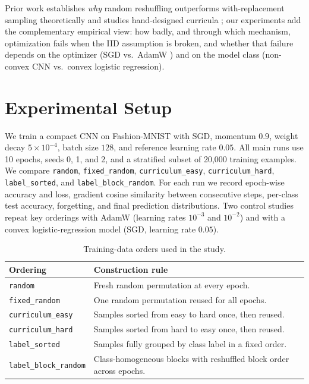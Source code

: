 \documentclass[conference]{IEEEtran}
\begin{document}
Prior work establishes \emph{why} random reshuffling outperforms
with-replacement sampling theoretically \cite{gurbuzbalaban2021} and
studies hand-designed curricula \cite{bengio2009curriculum}; our
experiments add the complementary empirical view: how badly, and through
which mechanism, optimization fails when the IID assumption is broken,
and whether that failure depends on the optimizer (SGD vs.\ AdamW
\cite{loshchilov2019adamw}) and on the model class (non-convex CNN vs.\
convex logistic regression).

\section{Experimental Setup}
We train a compact CNN on Fashion-MNIST \cite{xiao2017fashion} with SGD,
momentum $0.9$, weight decay $5\times10^{-4}$, batch size $128$, and
reference learning rate $0.05$.
All main runs use 10 epochs, seeds 0, 1, and 2, and a stratified subset
of 20{,}000 training examples.
We compare \texttt{random}, \texttt{fixed\_random},
\texttt{curriculum\_easy}, \texttt{curriculum\_hard},
\texttt{label\_sorted}, and \texttt{label\_block\_random}.
For each run we record epoch-wise accuracy and loss, gradient cosine
similarity between consecutive steps, per-class test accuracy, forgetting,
and final prediction distributions.
Two control studies repeat key orderings with AdamW (learning rates
$10^{-3}$ and $10^{-2}$) and with a convex logistic-regression model
(SGD, learning rate $0.05$).

\begin{table}[!t]
  \centering
  \caption{Training-data orders used in the study.}
  \label{tab:orders}
  \begin{tabular}{@{}p{}p{}@{}}
    \toprule
    Ordering & Construction rule \\
    \midrule
    \texttt{random} & Fresh random permutation at every epoch. \\
    \texttt{fixed\_random} & One random permutation reused for all epochs. \\
    \texttt{curriculum\_easy} & Samples sorted from easy to hard once, then reused. \\
    \texttt{curriculum\_hard} & Samples sorted from hard to easy once, then reused. \\
    \texttt{label\_sorted} & Samples fully grouped by class label in a fixed order. \\
    \texttt{label\_block\_random} & Class-homogeneous blocks with reshuffled block order across epochs. \\
    \bottomrule
  \end{tabular}
\end{table}
\FloatBarrier
\end{document}
